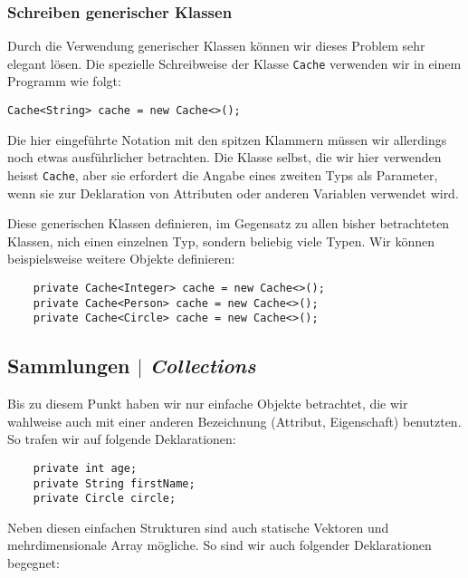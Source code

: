 \begin{frame}[fragile]
    \frametitle<presentation>{Schreiben generischer Klassen}
\end{frame}


Durch die Verwendung generischer Klassen können wir dieses Problem sehr elegant
lösen. Die spezielle Schreibweise der Klasse \texttt{Cache} verwenden wir in
einem Programm wie folgt:

\texttt{Cache<String> cache = new Cache<>();}

Die hier eingeführte Notation mit den spitzen Klammern müssen wir allerdings noch
etwas ausführlicher betrachten. Die Klasse selbst, die wir hier verwenden heisst
\texttt{Cache}, aber sie erfordert die Angabe eines zweiten Typs als Parameter,
wenn sie zur Deklaration von Attributen oder anderen Variablen verwendet wird.

Diese generischen Klassen definieren, im Gegensatz zu allen bisher betrachteten
Klassen, nich einen einzelnen Typ, sondern beliebig viele Typen. Wir können
beispielsweise weitere Objekte definieren:

\begin{verbatim}
    private Cache<Integer> cache = new Cache<>();
    private Cache<Person> cache = new Cache<>();
    private Cache<Circle> cache = new Cache<>();
\end{verbatim}




\subsection{Sammlungen $|$ \emph{Collections}}
\label{subsec:collections}

Bis zu diesem Punkt haben wir nur einfache Objekte betrachtet, die wir
wahlweise auch mit einer anderen Bezeichnung (Attribut, Eigenschaft)
benutzten. So trafen wir auf folgende Deklarationen:

\begin{verbatim}
    private int age;
    private String firstName;
    private Circle circle;
\end{verbatim}

Neben diesen einfachen Strukturen sind auch statische Vektoren und
mehrdimensionale Array mögliche. So sind wir auch folgender Deklarationen
begegnet:

